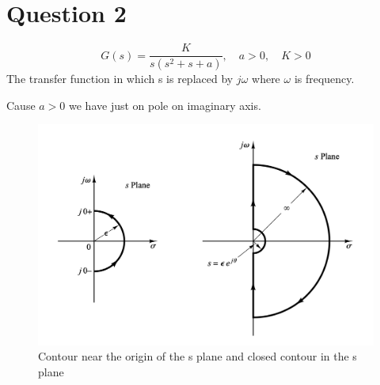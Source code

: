 \section{Question 2}
\begin{equation}
	G(s) = \dfrac{K}{s(s^2 + s + a)}, \quad a > 0, \quad K > 0
\end{equation}
The transfer function in which s is replaced by $j\omega$ where $\omega$ is frequency.

Cause $a>0$ we have just on pole on imaginary axis.
\begin{figure}[H]
	\caption{Contour near the origin of the s plane and closed contour in the s plane}
	\centering
	\includegraphics[width=12cm]{../Figure/Q2/nyquist_s_plane.png}
\end{figure}
